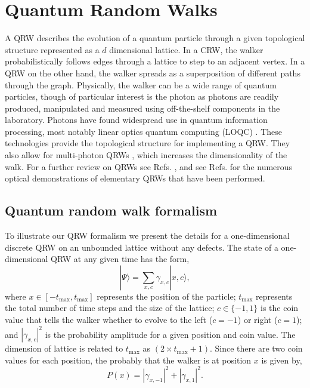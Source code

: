 \documentclass[aps,pra,twocolumn,amsmath,amssymb,nofootinbib,superscriptaddress]{revtex4}
\newcommand{\ket}[1]{|#1\rangle}
\begin{document}
\section{Quantum Random Walks}
A QRW describes the evolution of a quantum particle through a given topological structure represented as a $d$ dimensional lattice. In a CRW, the walker probabilistically follows edges through a lattice to step to an adjacent vertex. In a QRW on the other hand, the walker spreads as a superposition of different paths through the graph. Physically, the walker can be a wide range of quantum particles, though of particular interest is the photon as photons are readily produced, manipulated and measured using off-the-shelf components in the laboratory. Photons have found widespread use in quantum information processing, most notably linear optics quantum computing (LOQC) \cite{bib:KLM01}. These technologies provide the topological structure for implementing a QRW. They also allow for multi-photon QRWs \cite{bib:increasing12}, which increases the dimensionality of the walk. For a further review on QRWs see Refs. \cite{bib:ADZ, bib:AAKV, bib:Kempe08, bib:Salvador12}, and see Refs. \cite{bib:Hagai08, bib:Schreiber10, bib:Broome10, bib:Peruzzo10, bib:Schreiber11b, bib:Matthews11, bib:Owens11, bib:Schreiber12, Sansoni12} for the numerous optical demonstrations of elementary QRWs that have been performed.
  
\subsection{Quantum random walk formalism}
To illustrate our QRW formalism we present the details for a one-dimensional discrete QRW on an unbounded lattice without any defects. The state of a one-dimensional QRW at any given time has the form,
\begin{equation} \label{eq:State}
\ket{\Psi}=\sum_{x, c} \gamma_{x,c} \ket{x, c},
\end{equation}
where $x \in [-t_\mathrm{max},t_\mathrm{max}]$ represents the position of the particle; $t_\mathrm{max}$ represents the total number of time steps and the size of the lattice; $c \in \{-1,1\}$ is the coin value that tells the walker whether to evolve to the left ($c=-1$) or right ($c=1$); and $|\gamma_{x,c}|^{2}$ is the probability amplitude for a given position and coin value. The dimension of lattice is related to $t_\mathrm{max}$ as $(2\times t_\mathrm{max}+1)$. Since there are two coin values for each position, the probably that the walker is at position $x$ is given by,
\begin{equation} \label{eq:probX}
P(x)=|\gamma_{x,-1}|^{2}+|\gamma_{x,1}|^{2}.
\end{equation}
\end{document}
